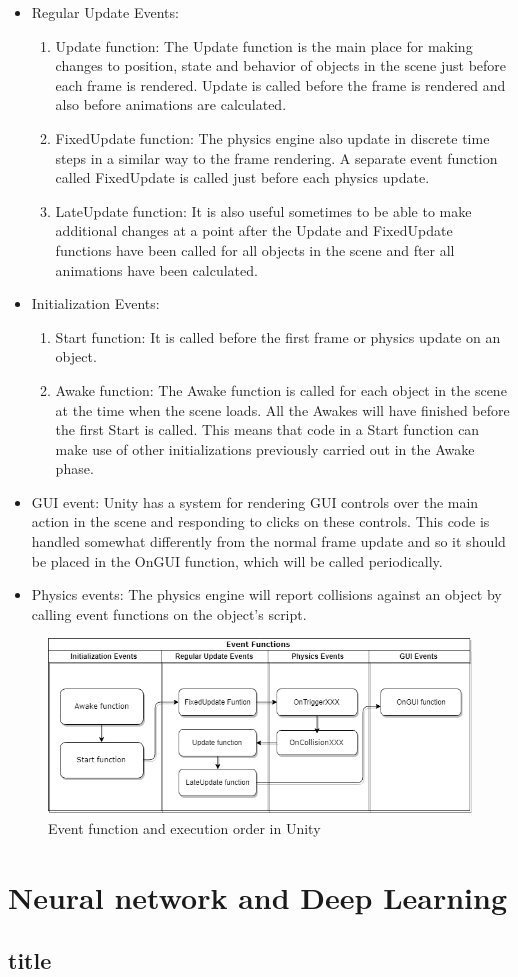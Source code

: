 \begin{itemize}
	\item Regular Update Events: 
	\begin{enumerate}
		\item Update function: The Update function is the main place for making changes to position, state and behavior of objects in the scene just before each frame is rendered. Update is called before the frame is rendered and also before animations are calculated.
		\item FixedUpdate function: The physics engine also update in discrete time steps in a similar way to the frame rendering. A separate event function called FixedUpdate is called just before each physics update.
		\item LateUpdate function: It is also useful sometimes to be able to make additional changes at a point after the Update and FixedUpdate functions have been called for all objects in the scene and fter all animations have been calculated.
	\end{enumerate}
	\item Initialization Events:
	\begin{enumerate}
		\item Start function: It is called before the first frame or physics update on an object.
		\item Awake function: The Awake function is called for each object in the scene at the time when the scene loads. All the Awakes will have finished before the first Start is called. This means that code in a Start function can make use of other initializations previously carried out in the Awake phase.
	\end{enumerate}
	\item GUI event: Unity has a system for rendering GUI controls over the main action in the scene and responding to clicks on these controls. This code is handled somewhat differently from the normal frame update and so it should be placed in the OnGUI function, which will be called periodically.
	\item Physics events: The physics engine will report collisions against an object by calling event functions on the object's script. 		
\end{itemize}
\begin{figure}[h]
	\centering
	\captionsetup{justification=centering}
	\includegraphics[width=\textwidth]{Figures/Section3_Eventfunction.png}
	\caption{Event function and execution order in Unity}
	\label{fig: event_function}
\end{figure}

\section{Neural network and Deep Learning}
\subsection{title}
